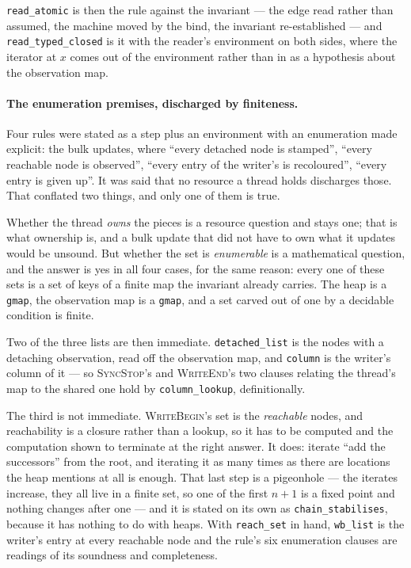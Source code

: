 \texttt{read\_atomic} is then the rule against the invariant --- the edge read
rather than assumed, the machine moved by the bind, the invariant
re-established --- and \texttt{read\_typed\_closed} is it with the reader's
environment on both sides, where the iterator at $x$ comes out of the
environment rather than in as a hypothesis about the observation map.

\paragraph{The enumeration premises, discharged by finiteness.}
Four rules were stated as a step plus an environment with an enumeration made
explicit: the bulk updates, where ``every detached node is stamped'', ``every
reachable node is observed'', ``every entry of the writer's is recoloured'',
``every entry is given up''.  It was said that no resource a thread holds
discharges those.  That conflated two things, and only one of them is true.

Whether the thread \emph{owns} the pieces is a resource question and stays one;
that is what ownership is, and a bulk update that did not have to own what it
updates would be unsound.  But whether the set is \emph{enumerable} is a
mathematical question, and the answer is yes in all four cases, for the same
reason: every one of these sets is a set of keys of a finite map the invariant
already carries.  The heap is a \texttt{gmap}, the observation map is a
\texttt{gmap}, and a set carved out of one by a decidable condition is finite.

Two of the three lists are then immediate.  \texttt{detached\_list} is the
nodes with a detaching observation, read off the observation map, and
\texttt{column} is the writer's column of it --- so \textsc{SyncStop}'s and
\textsc{WriteEnd}'s two clauses relating the thread's map to the shared one
hold by \texttt{column\_lookup}, definitionally.

The third is not immediate.  \textsc{WriteBegin}'s set is the \emph{reachable}
nodes, and reachability is a closure rather than a lookup, so it has to be
computed and the computation shown to terminate at the right answer.  It does:
iterate ``add the successors'' from the root, and iterating it as many times as
there are locations the heap mentions at all is enough.  That last step is a
pigeonhole --- the iterates increase, they all live in a finite set, so one of
the first $n+1$ is a fixed point and nothing changes after one --- and it is
stated on its own as \texttt{chain\_stabilises}, because it has nothing to do
with heaps.  With \texttt{reach\_set} in hand, \texttt{wb\_list} is the
writer's entry at every reachable node and the rule's six enumeration clauses
are readings of its soundness and completeness.

